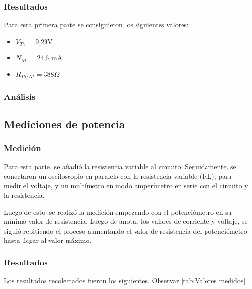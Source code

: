 \documentclass{article}
\begin{document}
            \subsubsection{Resultados}

                \quad Para esta primera parte se consiguieron los siguientes valores:
            	\begin{itemize}
                \item $V_{Th}$ = 9,29V
                \item $N_{Nt}$ = 24,6 mA
                \item $R_{Th/Nt} = 388  \Omega $
                \end{itemize}

            \subsubsection{Análisis}
        
        \subsection{Mediciones de potencia}

            \subsubsection{Medición}

            \quad Para esta parte, se añadió la resistencia variable al circuito. Seguidamente, se conectaron un osciloscopio en paralelo con la resistencia variable (RL), para medir el voltaje, y un multímetro en modo amperímetro en serie con el circuito y la resistencia.\par
            Luego de esto, se realizó la medición empezando con el potenciómetro en su mínimo valor de resistencia. Luego de anotar los valores de corriente y voltaje, se siguió repitiendo el proceso aumentando el valor de resistencia del potenciómetro hasta llegar al valor máximo.\par
            

            \subsubsection{Resultados}
            
            \quad Los resultados recolectados fueron los siguientes. Observar \autoref{tab:Valores medidos}
\end{document}
